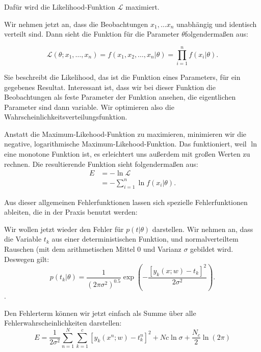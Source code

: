 Dafür wird die Likelihood-Funktion $\mathcal{L}$ maximiert.

Wir nehmen jetzt an, dass die Beobachtungen $x_1, \ldots x_n$ unabhängig und identisch verteilt sind. Dann sieht die Funktion für die Parameter $\theta$folgendermaßen aus:

\begin{equation}
  \mathcal{L} (\theta; x_1, \ldots, x_n) =
  f(x_1, x_2, \ldots, x_n | \theta) =
  \prod_{i = 1}^n f(x_i|\theta) .
\end{equation}

Sie beschreibt die Likelihood, das ist die Funktion eines Parameters, für ein gegebenes Resultat. Interessant ist, dass wir bei dieser Funktion die Beobachtungen als feste Parameter der Funktion ansehen, die eigentlichen Parameter sind dann variable. Wir optimieren also die Wahrscheinlichkeitsverteilungsfunktion.

Anstatt die Maximum-Likehood-Funktion zu maximieren, minimieren wir die negative, logarithmische Maximum-Likehood-Funktion. Das funktioniert, weil $\ln$ eine monotone Funktion ist, es erleichtert uns außerdem mit großen Werten zu rechnen. Die resultierende Funktion sieht folgendermaßen aus:
\begin{align}
 E  & = - \ln \mathcal{L} \\
  & = - \sum_{i=1}^n \ln f(x_i|\theta).
\end{align}

Aus dieser allgemeinen Fehlerfunktionen lassen sich spezielle Fehlerfunktionen ableiten, die in der Praxis benutzt werden\cite{bishop1995neural}:

Wir wollen jetzt wieder den Fehler für $p(t|\theta)$ darstellen. Wir nehmen an, dass die Variable $t_k$ aus einer deterministischen Funktion, und normalverteiltem Rauschen (mit dem arithmetischen Mittel $0$ und Varianz $\sigma$ gebildet wird.  
Deswegen gilt: %
\begin{equation}
  p(t_k|\theta) = \frac{1}{(2 \pi \sigma^2)^{0.5}} \exp \left( -\frac{ \left[  y_k(x; w) - t_k \right]^2 }{2 \sigma^2} \right).
\end{equation}.

Den Fehlerterm können wir jetzt einfach als Summe über alle Fehlerwahrscheinlichkeiten darstellen:
\begin{equation}
  E = \frac{1}{2 \sigma^2} \sum_{n=1}^{N} \sum_{k=1}^{c} \left[ y_k(x^n; w) - t_k^n \right]^2 + Nc \ln \sigma + \frac{N_c}{2} \ln (2 \pi)
\end{equation}

